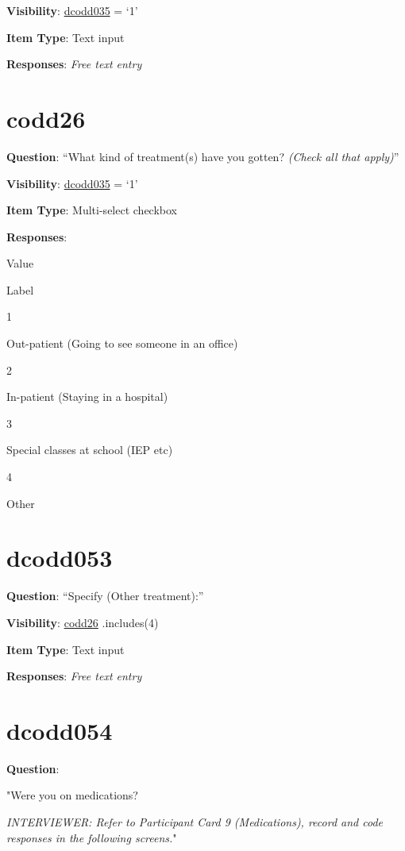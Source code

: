 \documentclass[]{book}
\begin{document}
\textbf{Visibility}: \protect\hyperlink{dcodd035}{dcodd035} = `1'

\textbf{Item Type}: Text input

\textbf{Responses}: \emph{Free text entry}

\hypertarget{codd26}{%
\section{codd26}\label{codd26}}

\textbf{Question}: ``What kind of treatment(s) have you gotten? \emph{(Check all that apply)}''

\textbf{Visibility}: \protect\hyperlink{dcodd035}{dcodd035} = `1'

\textbf{Item Type}: Multi-select checkbox

\textbf{Responses}:

Value

Label

1

Out-patient (Going to see someone in an office)

2

In-patient (Staying in a hospital)

3

Special classes at school (IEP etc)

4

Other

\hypertarget{dcodd053}{%
\section{dcodd053}\label{dcodd053}}

\textbf{Question}: ``Specify (Other treatment):''

\textbf{Visibility}: \protect\hyperlink{codd26}{codd26} .includes(4)

\textbf{Item Type}: Text input

\textbf{Responses}: \emph{Free text entry}

\hypertarget{dcodd054}{%
\section{dcodd054}\label{dcodd054}}

\textbf{Question}:

"Were you on medications?

\emph{INTERVIEWER: Refer to Participant Card 9 (Medications), record and code responses in the following screens.}"
\end{document}
